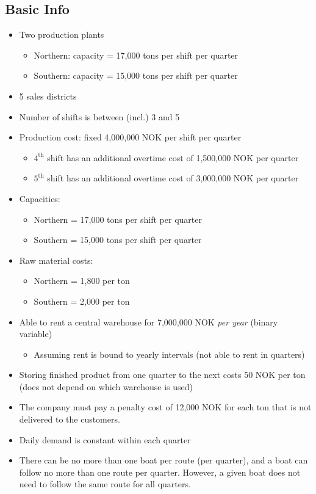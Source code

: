 \documentclass[10pt]{article}
\begin{document}
\subsection{Basic Info}
\begin{itemize}
    \item Two production plants
    \begin{itemize}
        \item Northern: capacity = 17,000 tons per shift per quarter
        \item Southern: capacity = 15,000 tons per shift per quarter
    \end{itemize}
    \item 5 sales districts 
    \item Number of shifts is between (incl.) 3 and 5
    \item Production cost: fixed 4,000,000 NOK per shift per quarter 
    \begin{itemize}
        \item $4^{\text{th}}$ shift has an additional overtime cost of 1,500,000 NOK per quarter
        \item $5^{\text{th}}$ shift has an additional overtime cost of 3,000,000 NOK per quarter
    \end{itemize}
    \item Capacities: 
    \begin{itemize}
        \item Northern = 17,000 tons per shift per quarter
        \item Southern = 15,000 tons per shift per quarter
    \end{itemize}
    \item Raw material costs: 
    \begin{itemize}
        \item Northern = 1,800 per ton 
        \item Southern = 2,000 per ton 
    \end{itemize}
    \item Able to rent a central warehouse for 7,000,000 NOK \textit{per year} (binary variable) 
    \begin{itemize}
        \item Assuming rent is bound to yearly intervals (not able to rent in quarters)
    \end{itemize}
    \item Storing finished product from one quarter to the next costs 50 NOK per ton (does not depend on which warehouse is used)
    \item The company must pay a penalty cost of 12,000 NOK for each ton that is not delivered to the customers.
    \item Daily demand is constant within each quarter
    \item There can be no more than one boat per route (per quarter), and a boat can follow no more than one route per quarter. However, a given boat does not need to follow the same route for all quarters.
\end{itemize}
\end{document}
